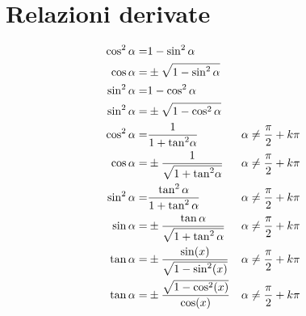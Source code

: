 \section{Relazioni derivate}
\begin{align*}
\cos^{2}\alpha=&{}1-\sin^{2}\alpha\\\index{Coseno!dato!seno}
\cos\alpha=&{}\pm\sqrt{1-\sin^{2}\alpha}\\
\sin^{2}\alpha=&{}1-\cos^{2}\alpha \\\index{Seno!dato!coseno}
\sin^{2}\alpha=&{}\pm\sqrt{1-\cos^{2}\alpha}\\
\cos^{2}\alpha=&{}\dfrac{1}{1+{\tan}^{2}\alpha} &&\alpha\neq\dfrac{\pi}{2}+k\pi\\
\cos\alpha=&{}\pm\dfrac{1}{\sqrt{1+{\tan}^{2}\alpha}} &&\alpha\neq\dfrac{\pi}{2}+k\pi\\\index{Coseno!dato!tangente}
\sin^{2}\alpha=&{}\dfrac{\tan^{2}\alpha}{1+\tan^{2}\alpha}&&\alpha\neq\dfrac{\pi}{2}+k\pi\\
\sin\alpha=&{}\pm\dfrac{\tan\alpha}{\sqrt{1+\tan^{2}\alpha}}&&\alpha\neq\dfrac{\pi}{2}+k\pi\\\index{Seno!dato!tangente}
\tan\alpha=&{}\pm\dfrac{\sin(x)}{\sqrt{1-\sin^2(x)}}&&\alpha\neq\dfrac{\pi}{2}+k\pi\\\index{Tangente!dato!seno}
\tan\alpha=&{}\pm\dfrac{\sqrt{1-\cos^2(x)}}{\cos(x)}
&&\alpha\neq\dfrac{\pi}{2}+k\pi\index{Tangente!dato!coseno}
\end{align*}
